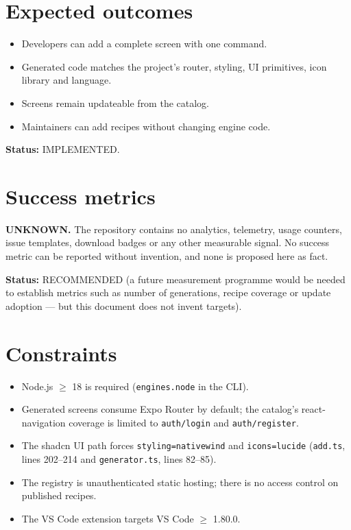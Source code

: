 \section{Expected outcomes}

\begin{itemize}
  \item Developers can add a complete screen with one command.
  \item Generated code matches the project's router, styling, UI primitives, icon
        library and language.
  \item Screens remain updateable from the catalog.
  \item Maintainers can add recipes without changing engine code.
\end{itemize}

\textbf{Status:} IMPLEMENTED.

\section{Success metrics}

\textbf{UNKNOWN.} The repository contains no analytics, telemetry, usage counters,
issue templates, download badges or any other measurable signal. No success
metric can be reported without invention, and none is proposed here as fact.

\textbf{Status:} RECOMMENDED (a future measurement programme would be needed to
establish metrics such as number of generations, recipe coverage or update
adoption --- but this document does not invent targets).

\section{Constraints}

\begin{itemize}
  \item Node.js $\geq$ 18 is required (\texttt{engines.node} in the CLI).
  \item Generated screens consume Expo Router by default; the catalog's
        react-navigation coverage is limited to \texttt{auth/login} and
        \texttt{auth/register}.
  \item The shadcn UI path forces \texttt{styling=nativewind} and
        \texttt{icons=lucide} (\texttt{add.ts}, lines 202--214 and
        \texttt{generator.ts}, lines 82--85).
  \item The registry is unauthenticated static hosting; there is no access
        control on published recipes.
  \item The VS Code extension targets VS Code $\geq$ 1.80.0.
\end{itemize}


